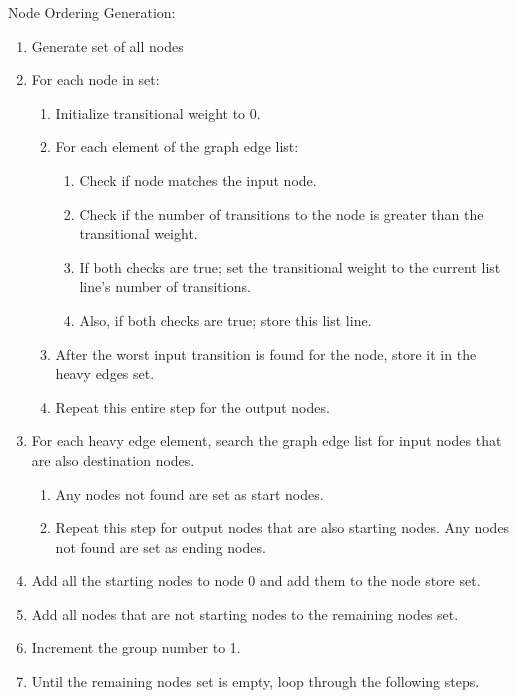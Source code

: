\begin{description}
    \item[Node Ordering Generation:]
\end{description}
 \begin{enumerate}
   \item Generate set of all nodes
   \item For each node in set:
   \begin{enumerate}
     \item Initialize transitional weight to 0.
     \item For each element of the graph edge list:
     \begin{enumerate}
       \item Check if node matches the input node.
       \item Check if the number of transitions to the node is greater than the
       transitional weight.
       \item If both checks are true; set the transitional weight to the current
       list line's number of transitions.
       \item Also, if both checks are true; store this list line.
     \end{enumerate}
     \item After the worst input transition is found for the node, store it in
     the heavy edges set.
     \item Repeat this entire step for the output nodes.
   \end{enumerate}
   \item For each heavy edge element, search the graph edge list
   for input nodes that are also destination nodes.
   \begin{enumerate}
     \item Any nodes not found are set as start nodes.
     \item Repeat this step for output nodes that are also starting nodes.  Any
     nodes not found are set as ending nodes.
   \end{enumerate}
   \item Add all the starting nodes to node 0 and add them to the node store
   set.
   \item Add all nodes that are not starting nodes to the remaining nodes
   set.
   \item Increment the group number to 1.
   \item Until the remaining nodes set is empty, loop through the following
   steps.
   \begin{enumerate}

\end{enumerate}
\end{enumerate}

